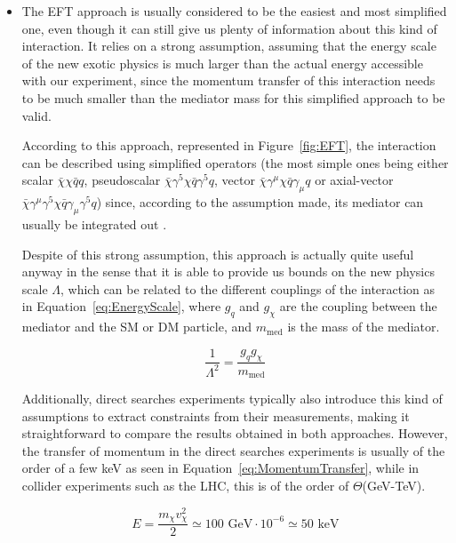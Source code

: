 \documentclass[a4paper, 10pt, openright]{report}
\begin{document}
\begin{itemize}
\item The \ac{EFT} approach is usually considered to be the easiest and most simplified one, even though it can still give us plenty of information about this kind of interaction. It relies on a strong assumption, assuming that the energy scale of the new exotic physics is much larger than the actual energy accessible with our experiment, since the momentum transfer of this interaction needs to be much smaller than the mediator mass for this simplified approach to be valid.

According to this approach, represented in Figure~\ref{fig:EFT}, the interaction can be described using simplified operators (the most simple ones being either scalar $\bar \chi \chi \bar q q$, pseudoscalar $\bar \chi \gamma^5 \chi \bar q \gamma^5 q$, vector $\bar \chi \gamma^{\mu} \chi \bar q \gamma_\mu q$ or axial-vector $\bar \chi \gamma^\mu \gamma^5 \chi \bar q \gamma_\mu \gamma^5 q$) since, according to the assumption made, its mediator can usually be integrated out \cite{ColliderSearches}. 

Despite of this strong assumption, this approach is actually quite useful anyway in the sense that it is able to provide us bounds on the new physics scale $\Lambda$, which can be related to the different couplings of the interaction as in Equation~\ref{eq:EnergyScale}, where $g_q$ and $g_\chi$ are the coupling between the mediator and the \ac{SM} or \ac{DM} particle, and $m_{\text{med}}$ is the mass of the mediator. 

\begin{equation}
\label{eq:EnergyScale}
\frac{1}{\Lambda^2} = \frac{g_q g_\chi}{m_{\text{med}}}
\end{equation}

Additionally, direct searches experiments typically also introduce this kind of assumptions to extract constraints from their measurements, making it straightforward to compare the results obtained in both approaches. However, the transfer of momentum in the direct searches experiments is usually of the order of a few keV as seen in Equation~\ref{eq:MomentumTransfer}, while in collider experiments such as the \ac{LHC}, this is of the order of $\Theta$(GeV-TeV).

\begin{equation}
\label{eq:MomentumTransfer}
E = \frac{m_\chi v_\chi^2}{2} \simeq 100 \text{ GeV} \cdot 10^{-6} \simeq 50 \text{ keV}
\end{equation}


\end{itemize}
\end{document}

